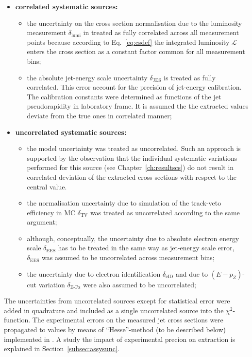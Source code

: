 \begin{itemize}
 \item \textbf{correlated systematic sources:}
 \begin{itemize}
 \item the uncertainty on the cross section normalisation due to the luminosity measurement $\delta_\text{lumi}$ in treated as fully correlated across all measurement points because according to Eq.~\eqref{eq:csdef} the integrated luminosity $\mathcal{L}$ enters the cross section as a constant factor common for all measurement bins;
 \item the absolute jet-energy scale uncertainty $\delta_\text{JES}$ is treated as fully correlated. This error account for the precision of jet-energy calibration. The calibration constants were determined as functions of the jet pseudorapidity in laboratory frame. It is assumed the the extracted values deviate from the true ones in correlated manner;
 \end{itemize}
 \item \textbf{uncorrelated systematic sources:}
 \begin{itemize}
 \item the model uncertainty was treated as uncorrelated. Such an approach is supported by the observation that the individual systematic variations performed for this source (see Chapter~\ref{ch:resultscs}) do not result in correlated deviation of the extracted cross sections with respect to the central value.
 \item the normalisation uncertainty due to simulation of the track-veto efficiency in MC $\delta_\text{TV}$ was treated as uncorrelated according to the same argument;
 \item although, conceptually, the uncertainty due to absolute electron energy scale $\delta_\text{EES}$ has to be treated in the same way as jet-energy scale error, $\delta_\text{EES}$ was assumed to be uncorrelated across measurement bins;
 \item the uncertainty due to electron identification $\delta_\text{eID}$ and due to $\left(E-p_Z\right)$-cut variation $\delta_\text{E-Pz}$ were also assumed to be uncorrelated;
 \end{itemize}
\end{itemize}
The uncertainties from uncorrelated sources except for statistical error were added in quadrature and included as a single uncorrelated source into the $\chi^2$-function. The experimental errors on the measured jet cross sections were propagated to \asz values by means of ``Hesse''-method (to be described below) implemented in \minuit. A study the impact of experimental precion on \asz extraction is explained in Section~\ref{subsec:assysunc}.
